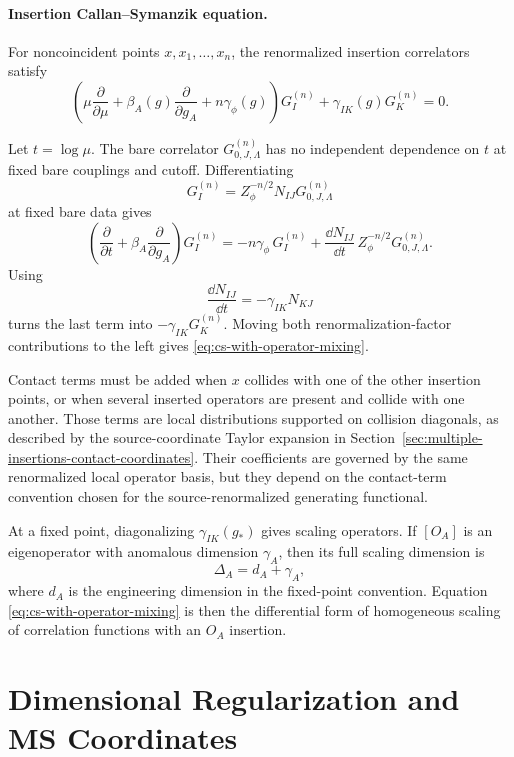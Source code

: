 \paragraph{Insertion Callan--Symanzik equation.}
For noncoincident points \(x,x_1,\ldots,x_n\), the renormalized insertion
correlators satisfy
\begin{equation}
  \left(
    \mu\frac{\partial}{\partial\mu}
    +
    \beta_A(g)\frac{\partial}{\partial g_A}
    +
    n\gamma_\phi(g)
  \right)G_I^{(n)}
  +
  \gamma_{IK}(g)G_K^{(n)}
  =
  0 .
  \label{eq:cs-with-operator-mixing}
\end{equation}

Let \(t=\log\mu\).  The bare correlator
\(G_{0,J,\Lambda}^{(n)}\) has no independent dependence on \(t\) at fixed bare
couplings and cutoff.  Differentiating
\[
  G_I^{(n)}
  =
  Z_\phi^{-n/2}N_{IJ}G_{0,J,\Lambda}^{(n)}
\]
at fixed bare data gives
\[
  \left(
    \frac{\partial}{\partial t}
    +
    \beta_A\frac{\partial}{\partial g_A}
  \right)G_I^{(n)}
  =
  -n\gamma_\phi\,G_I^{(n)}
  +
  \frac{\dd N_{IJ}}{\dd t}\,
  Z_\phi^{-n/2}G_{0,J,\Lambda}^{(n)} .
\]
Using
\[
  \frac{\dd N_{IJ}}{\dd t}
  =
  -\gamma_{IK}N_{KJ}
\]
turns the last term into \(-\gamma_{IK}G_K^{(n)}\).  Moving both
renormalization-factor contributions to the left gives
\eqref{eq:cs-with-operator-mixing}.

Contact terms must be added when \(x\) collides with one of the other
insertion points, or when several inserted operators are present and collide
with one another.  Those terms are local distributions supported on collision
diagonals, as described by the source-coordinate Taylor expansion in
Section~\ref{sec:multiple-insertions-contact-coordinates}.  Their coefficients
are governed by the same renormalized local operator basis, but they depend on
the contact-term convention chosen for the source-renormalized generating
functional.

At a fixed point, diagonalizing \(\gamma_{IK}(g_\ast)\) gives scaling
operators.  If \([O_A]\) is an eigenoperator with anomalous dimension
\(\gamma_A\), then its full scaling dimension is
\[
  \Delta_A=d_A+\gamma_A,
\]
where \(d_A\) is the engineering dimension in the fixed-point convention.
Equation \eqref{eq:cs-with-operator-mixing} is then the differential form of
homogeneous scaling of correlation functions with an \(O_A\) insertion.

\section{Dimensional Regularization and MS Coordinates}

